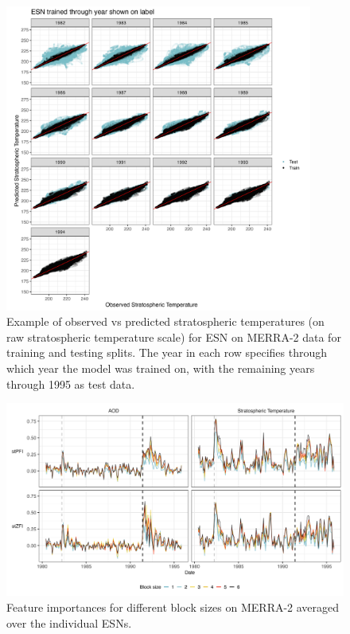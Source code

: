 \documentclass[AMS,STIX2COL]{WileyNJD-v2}
\begin{document}
\begin{figure}[h]
    \centering
    \includegraphics[width=0.9\textwidth]{figures/merra2_obs_pred.png}
    \caption{Example of observed vs predicted stratospheric temperatures (on raw stratospheric temperature scale) for ESN on MERRA-2 data for training and testing splits. The year in each row specifies through which year the model was trained on, with the remaining years through 1995 as test data. }
    \label{fig:merra2pred}
\end{figure}

\begin{figure}[h]
    \centering
    \includegraphics[width=\textwidth]{figures/merra2_fi_blocks_ens_aves.png}
    \caption{Feature importances for different block sizes on MERRA-2 averaged over the individual ESNs.}
    \label{fig:merra2blockave}
\end{figure}
\end{document}
